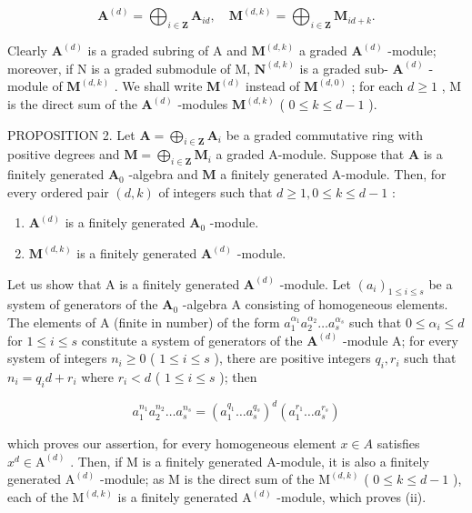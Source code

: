 \[
\mathbf {A} ^ {(d)} = \bigoplus_ {i \in \mathbf {Z}} \mathbf {A} _ {i d}, \quad \mathbf {M} ^ {(d, k)} = \bigoplus_ {i \in \mathbf {Z}} \mathbf {M} _ {i d + k}.
\]

Clearly \(\mathbf{A}^{(d)}\) is a graded subring of A and \(\mathbf{M}^{(d,k)}\) a graded \(\mathbf{A}^{(d)}\) -module; moreover, if N is a graded submodule of M, \(\mathbf{N}^{(d,k)}\) is a graded sub- \(\mathbf{A}^{(d)}\) -module of \(\mathbf{M}^{(d,k)}\) . We shall write \(\mathbf{M}^{(d)}\) instead of \(\mathbf{M}^{(d,0)}\) ; for each \(d \geqslant 1\) , M is the direct sum of the \(\mathbf{A}^{(d)}\) -modules \(\mathbf{M}^{(d,k)}\) ( \(0 \leqslant k \leqslant d - 1\) ).

PROPOSITION 2. Let \(\mathbf{A} = \bigoplus_{i\in \mathbf{Z}}\mathbf{A}_i\) be a graded commutative ring with positive degrees and \(\mathbf{M} = \bigoplus_{i\in \mathbf{Z}}\mathbf{M}_i\) a graded A-module. Suppose that \(\mathbf{A}\) is a finitely generated \(\mathbf{A}_0\) -algebra and \(\mathbf{M}\) a finitely generated A-module. Then, for every ordered pair \((d,k)\) of integers such that \(d\geqslant 1,0\leqslant k\leqslant d - 1\) :

\begin{enumerate}
\def\labelenumi{(\roman{enumi})}
\item
  \(\mathbf{A}^{(d)}\) is a finitely generated \(\mathbf{A}_0\) -module.
\item
  \(\mathbf{M}^{(d,k)}\) is a finitely generated \(\mathbf{A}^{(d)}\) -module.
\end{enumerate}

Let us show that A is a finitely generated \(\mathbf{A}^{(d)}\) -module. Let \((a_{i})_{1\leqslant i\leqslant s}\) be a system of generators of the \(\mathbf{A}_0\) -algebra A consisting of homogeneous elements. The elements of A (finite in number) of the form \(a_1^{\alpha_1}a_2^{\alpha_2}\ldots a_s^{\alpha_s}\) such that \(0\leqslant \alpha_{i}\leqslant d\) for \(1\leqslant i\leqslant s\) constitute a system of generators of the \(\mathbf{A}^{(d)}\) -module A; for every system of integers \(n_i\geqslant 0\) ( \(1\leqslant i\leqslant s\) ), there are positive integers \(q_{i}, r_{i}\) such that \(n_i = q_id + r_i\) where \(r_i < d\) ( \(1\leqslant i\leqslant s\) ); then

\[
a _ {1} ^ {n _ {1}} a _ {2} ^ {n _ {2}} \dots a _ {s} ^ {n _ {s}} = (a _ {1} ^ {q _ {1}} \dots a _ {s} ^ {q _ {s}}) ^ {d} (a _ {1} ^ {r _ {1}} \dots a _ {s} ^ {r _ {s}})
\]

which proves our assertion, for every homogeneous element \(x \in A\) satisfies \(x^{d} \in \mathrm{A}^{(d)}\) . Then, if M is a finitely generated A-module, it is also a finitely generated \(\mathrm{A}^{(d)}\) -module; as M is the direct sum of the \(\mathrm{M}^{(d,k)}\) ( \(0 \leqslant k \leqslant d - 1\) ), each of the \(\mathrm{M}^{(d,k)}\) is a finitely generated \(\mathrm{A}^{(d)}\) -module, which proves (ii).

